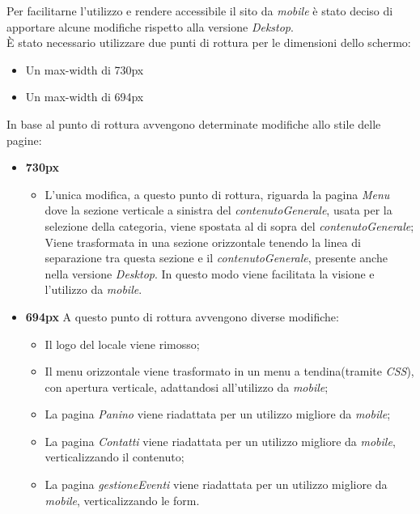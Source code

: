 Per facilitarne l'utilizzo e rendere accessibile il sito da \emph{mobile} è stato deciso di apportare alcune modifiche rispetto alla versione \emph{Dekstop}.\\
È stato necessario utilizzare due punti di rottura per le dimensioni dello schermo:
\begin{itemize}
	\item Un max-width di 730px
	\item Un max-width di 694px
\end{itemize}
In base al punto di rottura avvengono determinate modifiche allo stile delle pagine:
\begin{itemize}
	\item \textbf{730px}
	\begin{itemize}
		\item L'unica modifica, a questo punto di rottura, riguarda la pagina \emph{Menu} dove la sezione verticale a sinistra del \emph{contenutoGenerale}, usata per la selezione della categoria, viene spostata al di sopra del \emph{contenutoGenerale};
Viene trasformata in una sezione orizzontale tenendo la linea di separazione tra questa sezione e il \emph{contenutoGenerale}, presente anche nella versione \emph{Desktop}. 
In questo modo viene facilitata la visione e l'utilizzo da \emph{mobile}.
	\end{itemize}
	\item \textbf{694px}
	A questo punto di rottura avvengono diverse modifiche:
	\begin{itemize}
		\item Il logo del locale viene rimosso;
		\item Il menu orizzontale viene trasformato in un menu a tendina(tramite \emph{CSS}), con apertura verticale, adattandosi all'utilizzo da \emph{mobile};
		\item La pagina \emph{Panino} viene riadattata per un utilizzo migliore da \emph{mobile};
		\item La pagina \emph{Contatti} viene riadattata per un utilizzo migliore da \emph{mobile}, verticalizzando il contenuto;
		\item La pagina \emph{gestioneEventi} viene riadattata per un utilizzo migliore da \emph{mobile}, verticalizzando le form.
	\end{itemize}
\end{itemize}